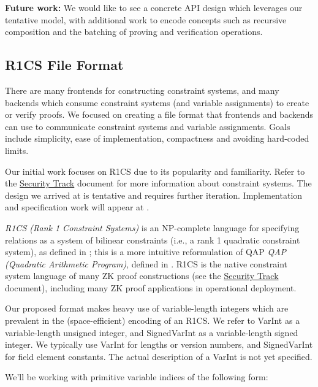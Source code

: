 \textbf{Future work:} 
We would like to see a concrete API design which leverages our tentative model, with additional work to encode concepts such as recursive composition and the batching of proving and verification operations.


\subsection{R1CS File Format}

There are many frontends for constructing constraint systems, and many backends which consume constraint systems (and variable assignments) to create or verify proofs. We focused on creating a file format that frontends and backends can use to communicate constraint systems and variable assignments. Goals include simplicity, ease of implementation, compactness and avoiding hard-coded limits.

Our initial work focuses on R1CS due to its popularity and familiarity. 
Refer to the \hyperref[chap:security]{Security Track} document for more information about constraint systems. 
The design we arrived at is tentative and requires further iteration. 
Implementation and specification work will appear at .


\emph{R1CS (Rank 1 Constraint Systems)} is an NP-complete language for specifying relations as a system of bilinear constraints (i.e., a rank 1 quadratic constraint system), 
as defined in \cite[Appendix E in extended version]{2013:crypto:SNARKs-for-C}; %
this is a more intuitive reformulation of QAP \emph{QAP (Quadratic Arithmetic Program)}, 
defined in \cite{2013:SP:Pinocchio}. %
R1CS is the native constraint system language of many ZK proof constructions (see the \hyperref[chap:security]{Security Track} document), including many ZK proof applications in operational deployment.

Our proposed format makes heavy use of variable-length integers which are prevalent in the (space-efficient) encoding of an R1CS. 
We refer to VarInt as a variable-length unsigned integer, and SignedVarInt as a variable-length signed integer. 
We typically use VarInt for lengths or version numbers, and SignedVarInt for field element constants. 
The actual description of a VarInt is not yet specified.

We’ll be working with primitive variable indices of the following form:

